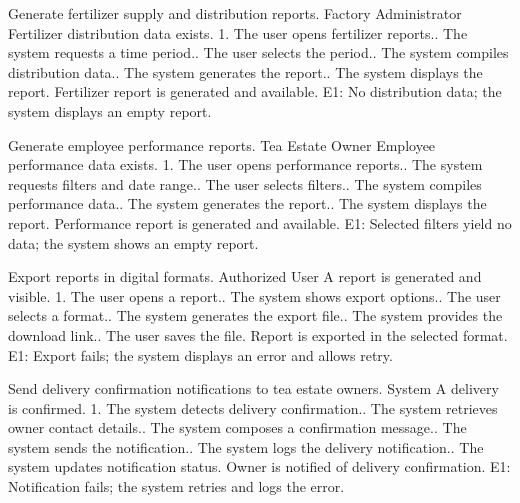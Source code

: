 {Generate fertilizer supply and distribution reports.}
{Factory Administrator}
{Fertilizer distribution data exists.}
{1. The user opens fertilizer reports.. The system requests a time period.. The user selects the period.. The system compiles distribution data.. The system generates the report.. The system displays the report.}
{Fertilizer report is generated and available.}
{E1: No distribution data; the system displays an empty report.}

{Generate employee performance reports.}
{Tea Estate Owner}
{Employee performance data exists.}
{1. The user opens performance reports.. The system requests filters and date range.. The user selects filters.. The system compiles performance data.. The system generates the report.. The system displays the report.}
{Performance report is generated and available.}
{E1: Selected filters yield no data; the system shows an empty report.}

{Export reports in digital formats.}
{Authorized User}
{A report is generated and visible.}
{1. The user opens a report.. The system shows export options.. The user selects a format.. The system generates the export file.. The system provides the download link.. The user saves the file.}
{Report is exported in the selected format.}
{E1: Export fails; the system displays an error and allows retry.}

{Send delivery confirmation notifications to tea estate owners.}
{System}
{A delivery is confirmed.}
{1. The system detects delivery confirmation.. The system retrieves owner contact details.. The system composes a confirmation message.. The system sends the notification.. The system logs the delivery notification.. The system updates notification status.}
{Owner is notified of delivery confirmation.}
{E1: Notification fails; the system retries and logs the error.}

